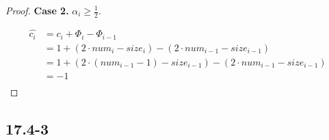 \begin{proof}
    \textbf{Case 2.}
    $\alpha_i \geq \frac{1}{2}$.
    
    \begin{equation*}
    \begin{split}
        \hat{c_i} & = c_i + \Phi_i - \Phi_{i-1} \\
        & = 1 + (2 \cdot num_i - size_i) - (2 \cdot num_{i-1} - size_{i-1}) \\
        & = 1 + (2 \cdot (num_{i-1} - 1) - size_{i-1}) - (2 \cdot num_{i-1} - size_{i-1}) \\
        & = -1 \\
    \end{split}
    \end{equation*}
\end{proof}

\subsection*{17.4-3}

